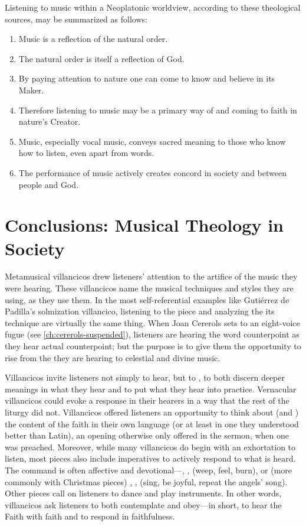 Listening to music within a Neoplatonic worldview, according to these
theological sources, may be summarized as follows:
\begin{enumerate}
\item Music is a reflection of the natural order.
\item The natural order is itself a reflection of God.
\item By paying attention to nature one can come to know and believe in its
    Maker.
\item Therefore listening to music may be a primary way of  and coming to faith in nature's Creator.
\item Music, especially vocal music, conveys sacred meaning to those who know
    how to listen, even apart from words.
\item The performance of music actively creates concord in society and between
    people and God.  
\end{enumerate}


\section{Conclusions: Musical Theology in Society}

Metamusical villancicos drew listeners' attention to the artifice of the music
they were hearing. 
These villancicos name the musical techniques and styles they are using, as
they use them.  
In the most self-referential examples like Gutiérrez de Padilla's solmization
villancico, listening to the piece and analyzing the its technique are
virtually the same thing. %
When Joan Cererols sets  to an eight-voice fugue
(see \cref{ch:cererols-suspended}), listeners are hearing the word counterpoint
as they hear actual counterpoint; but the purpose is to give them the
opportunity to rise from the  they are hearing to
celestial and divine music.

Villancicos invite listeners not simply to hear, but to , to
both discern deeper meanings in what they hear and to put what they hear into
practice.
Vernacular villancicos could evoke a response in their hearers in a way that
the rest of the liturgy did not.
Villancicos offered listeners an opportunity to think about (and ) the content of the faith in their own language (or at least in one they
understood better than Latin), an opening otherwise only offered in the sermon,
when one was preached.
Moreover, while many villancicos do begin with an exhortation to listen, most
pieces also include imperatives to actively respond to what is heard.
The command is often affective and devotional---,
,  (weep, feel, burn), or (more commonly with
Christmas pieces) , ,  (sing, be
joyful, repeat the angels' song).
Other pieces call on listeners to dance and play instruments.
In other words, villancicos ask listeners to both contemplate and obey---in
short, to hear the Faith with faith and to respond in faithfulness. 

